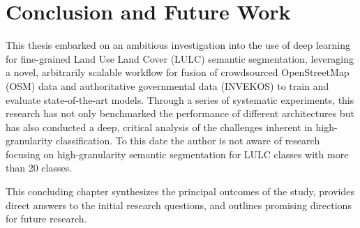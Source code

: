 \documentclass{report}
\begin{document}
\clearpage %

\section{Conclusion and Future Work}
This thesis embarked on an ambitious investigation into the use of deep learning for fine-grained Land Use Land Cover (LULC) semantic segmentation, leveraging a novel, arbitrarily scalable workflow for fusion of crowdsourced OpenStreetMap (OSM) data and authoritative governmental data (INVEKOS) to train and evaluate state-of-the-art models. Through a series of systematic experiments, this research has not only benchmarked the performance of different architectures but has also conducted a deep, critical analysis of the challenges inherent in high-granularity classification. To this date the author is not aware of research focusing on high-granularity semantic segmentation for LULC classes with more than 20 classes. \par
This concluding chapter synthesizes the principal outcomes of the study, provides direct answers to the initial research questions, and outlines promising directions for future research.
\end{document}
